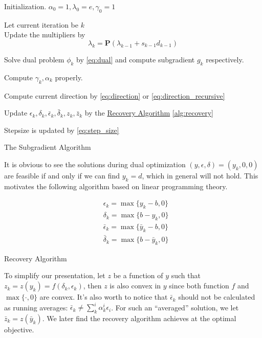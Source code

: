 \begin{algorithm}[H]
  \SetAlgoLined
  Initialization. \(\alpha_0 = 1, \lambda_0 = e, \gamma_0 = 1\)  \\
  {
    Let current iteration be \(k\)\\
    Update the multipliers by
    \[\lambda_{k} = \mathbf{P}(\lambda_{k-1} + s_{k-1}d_{k-1})\]

    Solve dual problem \(\phi_k\) by \eqref{eq:dual}
    and compute subgradient \(g_k\) respectively.

    Compute \(\gamma_k, \alpha_k\) properly.

    Compute current direction by \eqref{eq:direction} or \eqref{eq:direction_recursive}

    Update \(\epsilon_k,\delta_k ,\bar \epsilon_k ,\bar \delta_k, z_k, \bar z_k \)
    by the \underline{Recovery Algorithm} \ref{alg:recovery}

    Stepsize is updated by \eqref{eq:step_size}
  }
  \caption{The Subgradient Algorithm}
\end{algorithm}

It is obvious to see the solutions during dual optimization
\((y, \epsilon, \delta) = (y_k, 0, 0)\) are feasible if and only if we
can find \(y_k = d\), which in general will not hold. This motivates the following
algorithm based on linear programming theory.

\begin{algorithm}[H]\label{alg:recovery}
  \SetAlgoLined
  \begin{equation}\label{eq:recovery}
    \begin{aligned}
       & \epsilon_k = \max\{y_k - b, 0\}           \\
       & \delta_k = \max\{b - y_k, 0\}             \\
       & \bar \epsilon_k = \max\{\bar y_k - b, 0\} \\
       & \bar \delta_k = \max\{b - \bar y_k, 0\}
    \end{aligned}\end{equation}
  \caption{Recovery Algorithm}
\end{algorithm}

To simplify our presentation, let
\(z\) be a function of \(y\) such that \(z_k = z(y_k) = f(\delta_k, \epsilon_k)\), then \(z\) is
also convex in \(y\) since both function \(f\) and \(\max\{\cdot, 0\}\)
are convex. It's also worth to notice that \(\bar \epsilon_k\) should
not be calculated as running averages:
\(\bar \epsilon_k \neq \sum^i_k \alpha^i_k \epsilon_i\). For such an
``averaged'' solution, we let
\(\bar z_k = z(\bar y_k)\). We later find the recovery algorithm achieves
at the optimal objective.


